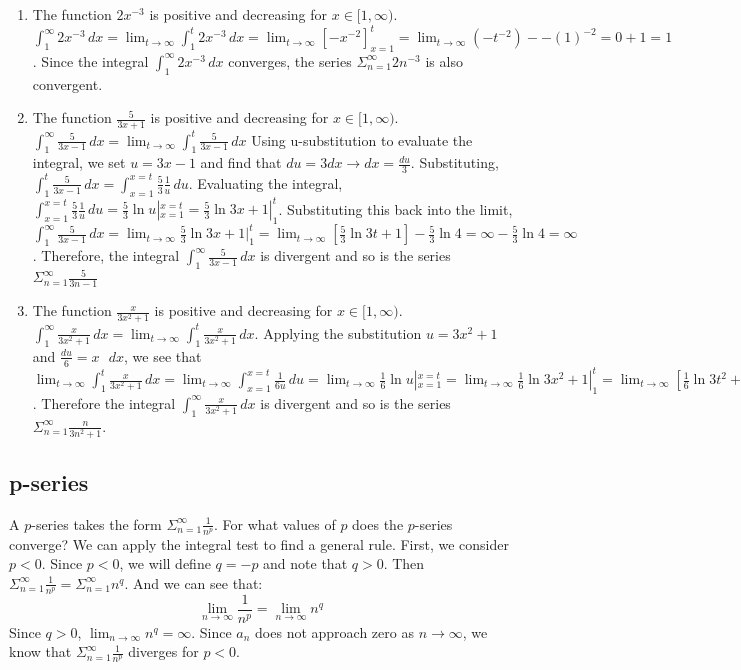 \begin{Answer}[ref= series1]
\begin{enumerate}
\item The function $2x^{-3}$ is positive and decreasing for $x \in [1, \infty)$. 
$\int_1^\infty 2x^{-3}\,dx = \lim_{t \to \infty} \int_1^t 2x^{-3}\,dx = \lim_{t 
\to \infty} \left[-x^{-2} \right]_{x = 1}^t = \lim_{t \to \infty} ( -t^{-2}) - 
-(1)^{-2} = 0 + 1 = 1$. Since the integral $\int_1^\infty 2x^{-3}\,dx$ converges, 
the series $\Sigma_{n = 1}^\infty 2n^{-3}$ is also convergent.
\item The function $\frac{5}{3x+1}$ is positive and decreasing for $x \in [1, 
\infty)$. $\int_1^\infty \frac{5}{3x-1}\,dx = \lim_{t \to \infty} \int_1^t 
\frac{5}{3x-1}\,dx$ Using u-substitution to evaluate the integral, we set $u = 
3x-1$ and find that $du = 3dx \rightarrow dx = \frac{du}{3}$. Substituting, 
$\int_1^t \frac{5}{3x-1}\,dx = \int_{x=1}^{x=t} \frac{5}{3}\frac{1}{u}\,du$. 
Evaluating the integral, $\int_{x=1}^{x=t} \frac{5}{3}\frac{1}{u}\,du = 
\frac{5}{3}\ln{u}|_{x = 1}^{x =t} = \frac{5}{3}\ln{3x+1}|_{1}^t$. Substituting 
this back into the limit, $\int_1^\infty \frac{5}{3x-1}\,dx = \lim_{t \to 
\infty} \frac{5}{3}\ln{3x+1}|_{1}^t = \lim_{t \to \infty} [ \frac{5}{3} 
\ln{3t+1} ] - \frac{5}{3}\ln{4} = \infty - \frac{5}{3}\ln{4} = \infty$. 
Therefore, the integral $\int_1^\infty \frac{5}{3x-1}\,dx$ is divergent and so 
is the series $\Sigma_{n = 1}^\infty \frac{5}{3n-1}$
\item The function $\frac{x}{3x^2 + 1}$ is positive and decreasing for $x\in 
[1,\infty)$. $\int_1^\infty \frac{x}{3x^2 + 1}\,dx = \lim_{t \to \infty} 
\int_1^t \frac{x}{3x^2 + 1}\,dx$. Applying the substitution $u = 3x^2 + 1$ 
and $\frac{du}{6} = x\text{ }dx$, we see that $\lim_{t \to \infty} \int_1^t 
\frac{x}{3x^2 + 1}\,dx = \lim_{t \to \infty} \int_{x=1}^{x=t} \frac{1}{6u}\,du 
= \lim_{t \to \infty} \frac{1}{6}\ln{u}|_{x = 1}^{x = t} = \lim_{t \to \infty} 
\frac{1}{6}\ln{3x^2 + 1}|_{1}^{t} = \lim_{t \to \infty} \left[ \frac{1}{6}
\ln{3t^2 + 1} \right] - \frac{1}{6}\ln{4} = \infty$. Therefore the integral 
$\int_1^\infty \frac{x}{3x^2 + 1}\,dx$ is divergent and so is the series 
$\Sigma_{n = 1}^\infty \frac{n}{3n^2 + 1}$. 
\end{enumerate}
\end{Answer}

\subsection{p-series}
A $p$-series takes the form $\Sigma_{n=1}^\infty \frac{1}{n^p}$. For what 
values of $p$ does the $p$-series converge? We can apply the integral test to 
find a general rule. First, we consider $p < 0$. 
Since $p < 0$, we will define $q = -p$ and note that $q > 0$. Then $\Sigma_
{n=1}^\infty \frac{1}{n^p} = \Sigma_{n=1}^\infty n^q$. And we can see that:
$$\lim_{n \to \infty}\frac{1}{n^p} = \lim_{n \to \infty}n^q$$
Since $q > 0$, $\lim_{n \to \infty}n^q = \infty$. Since $a_n$ does not 
approach zero as $n \to \infty$, we know that $\Sigma_{n = 1}^\infty 
\frac{1}{n^p}$ diverges for $p < 0$. 


